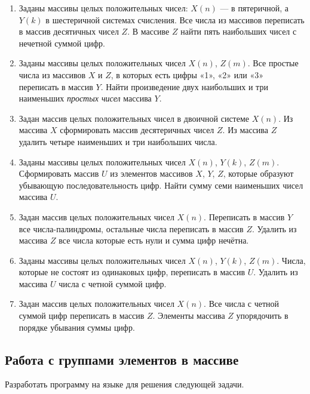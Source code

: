 \begin{enumerate}
\item Заданы массивы целых положительных чисел:  $X(n)$ --- в пятеричной, а
$Y(k)$ в  шестеричной системах счисления. Все числа из массивов переписать в массив десятичных
чисел $Z$. В массиве $Z$ найти пять наибольших чисел с нечетной суммой цифр.
\item Заданы массивы целых положительных чисел $X(n)$, $Z(m)$. Все
простые числа из массивов $X$ и $Z$, в которых есть цифры «1», «2» или «3» переписать в
массив $Y$. Найти произведение двух наибольших и три наименьших \emph{простых
чисел} массива $Y$.
\item Задан массив целых положительных чисел в двоичной системе $X(n)$. Из массива
$X$ сформировать массив десятеричных чисел $Z$. Из массива $Z$ удалить
четыре наименьших и три наибольших числа.
\item Заданы массивы целых положительных чисел $X(n)$, $Y(k)$,
$Z(m)$. Сформировать массив $U$ из элементов массивов $X$,
$Y$, $Z$, которые образуют убывающую последовательность цифр. Найти сумму семи
наименьших чисел массива $U$.
\item Задан массив целых положительных чисел $X(n)$. Переписать в массив $Y$
все числа-палиндромы, остальные числа переписать в массив $Z$. Удалить из массива $Z$ все числа
которые есть нули и сумма цифр нечётна.
\item Заданы массивы целых положительных чисел $X(n)$, $Y(k)$,
$Z(m)$. Числа, которые не состоят из одинаковых цифр, переписать в массив $U$.
Удалить из массива $U$ числа с четной суммой цифр.
\item Задан массив целых положительных чисел $X(n)$. Все числа с четной суммой цифр  переписать
в массив $Z$. Элементы массива $Z$ упорядочить в порядке убывания суммы цифр.
\end{enumerate}

\subsection[Работа с группами элементов в массиве]{Работа с группами элементов в массиве}
Разработать программу на языке  для решения следующей задачи.

